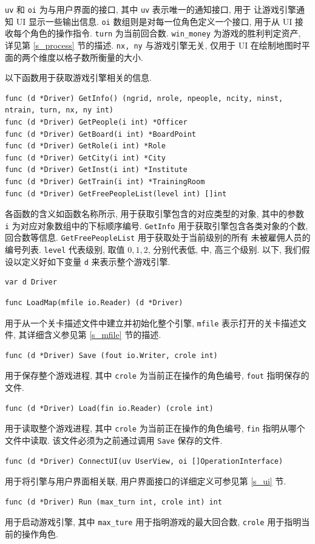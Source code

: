 \documentclass[UTF8, zihao=-4]{ctexart} %
\newcommand{\lcode}{\lstinline} % 段内插入代码
\begin{document}
\lcode{uv} 和 \lcode{oi} 为与用户界面的接口, 其中 \lcode{uv} 表示唯一的通知接口, 用于
让游戏引擎通知 UI 显示一些输出信息. \lcode{oi} 数组则是对每一位角色定义一个接口, 
用于从 UI 接收每个角色的操作指令. \lcode{turn} 为当前回合数.
\lcode{win_money} 为游戏的胜利判定资产, 详见第 \ref{s_process} 节的描述.
\lcode{nx, ny} 与游戏引擎无关, 仅用于 UI 在绘制地图时平面的两个维度以格子数所衡量的大小.

以下函数用于获取游戏引擎相关的信息.
\begin{lstlisting}
func (d *Driver) GetInfo() (ngrid, nrole, npeople, ncity, ninst, ntrain, turn, nx, ny int)
func (d *Driver) GetPeople(i int) *Officer 
func (d *Driver) GetBoard(i int) *BoardPoint 
func (d *Driver) GetRole(i int) *Role 
func (d *Driver) GetCity(i int) *City 
func (d *Driver) GetInst(i int) *Institute 
func (d *Driver) GetTrain(i int) *TrainingRoom 
func (d *Driver) GetFreePeopleList(level int) []int 
\end{lstlisting}
各函数的含义如函数名称所示, 用于获取引擎包含的对应类型的对象, 其中的参数 \lcode{i} 为对应对象数组中的下标顺序编号. 
\lcode{GetInfo} 用于获取引擎包含各类对象的个数, 回合数等信息. \lcode{GetFreePeopleList} 用于获取处于当前级别的所有
未被雇佣人员的编号列表. \lcode{level} 代表级别, 取值 $0, 1, 2$, 分别代表低, 中, 高三个级别.
以下, 我们假设以定义好如下变量 \lcode{d} 来表示整个游戏引擎.
\begin{lstlisting}
var d Driver
\end{lstlisting}

\begin{lstlisting}
func LoadMap(mfile io.Reader) (d *Driver)
\end{lstlisting}
用于从一个关卡描述文件中建立并初始化整个引擎, \lcode{mfile} 表示打开的关卡描述文件, 其详细含义参见第 \ref{s_mfile} 节的描述.
\begin{lstlisting}
func (d *Driver) Save (fout io.Writer, crole int) 
\end{lstlisting}
用于保存整个游戏进程, 其中 \lcode{crole} 为当前正在操作的角色编号, \lcode{fout} 指明保存的文件.
\begin{lstlisting}
func (d *Driver) Load(fin io.Reader) (crole int)
\end{lstlisting}
用于读取整个游戏进程, 其中 \lcode{crole} 为当前正在操作的角色编号, \lcode{fin} 指明从哪个文件中读取. 该文件必须为之前通过调用 \lcode{Save} 保存的文件.
\begin{lstlisting}
func (d *Driver) ConnectUI(uv UserView, oi []OperationInterface)
\end{lstlisting}
用于将引擎与用户界面相关联, 用户界面接口的详细定义可参见第 \ref{s_ui} 节.
\begin{lstlisting}
func (d *Driver) Run (max_turn int, crole int) int
\end{lstlisting}
用于启动游戏引擎, 其中 \lcode{max_ture} 用于指明游戏的最大回合数, \lcode{crole} 用于指明当前的操作角色.
\end{document}
